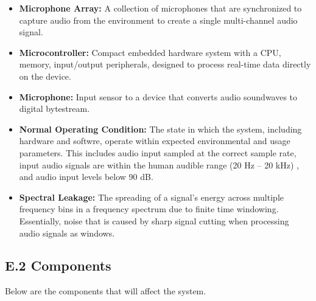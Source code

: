 \documentclass[12pt]{article}
\theoremstyle{definition}
\begin{document}
\begin{itemize}
    \item \textbf{Microphone Array:}\label{def:microphone_array} A collection of 
    microphones that are synchronized to capture audio from the 
    environment to create a single multi-channel audio signal.

    \item \textbf{Microcontroller:}\label{def:microcontroller} Compact embedded
    hardware system with a CPU, memory, input/output peripherals, designed to
    process real-time data directly on the device.

    \item \textbf{Microphone:}\label{def:microphone} Input sensor to a device
    that converts audio soundwaves to digital bytestream.

    \item \textbf{Normal Operating Condition:}
    \label{def:normal_operation_condition} The state in which the system,
    including hardware and softwre, operate within expected environmental and
    usage parameters. This includes audio input sampled at the correct sample
    rate, input audio signals are within the human audible range
    (20 Hz – 20 kHz) \cite{Neuroscience2001}, and audio input levels below
    90 dB.

    \item \textbf{Spectral Leakage:} \label{def:spectral_leakage} 
    The spreading of a signal's energy across multiple frequency bins in a
    frequency spectrum due to finite time windowing. Essentially, noise that is
    caused by sharp signal cutting when processing audio signals as windows.

\end{itemize}

\subsection{E.2 Components}

Below are the components that will affect the system.
\end{document}
